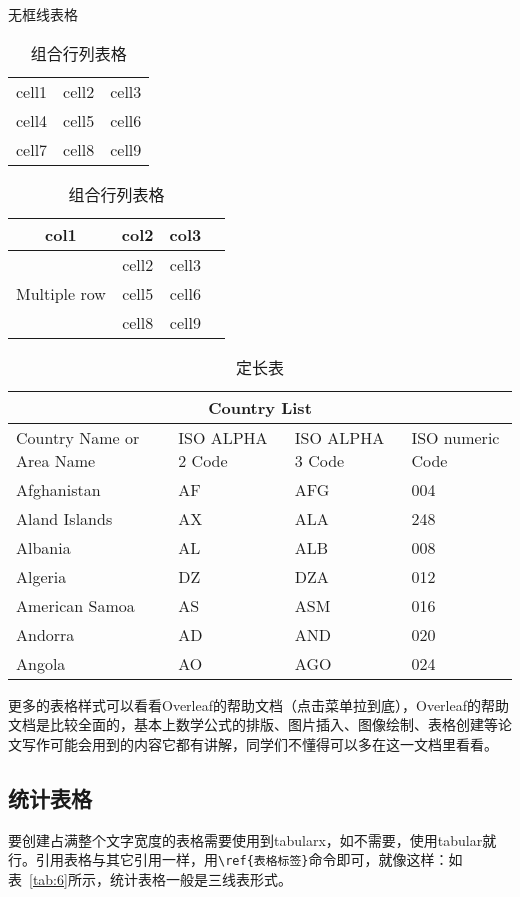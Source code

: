 \begin{table}[ht]
\begin{minipage}[t]{0.5\textwidth}
  \centering
  \caption{无框线表格}
  \label{tab:3}
  \begin{tabular}{ c c c }
 cell1 & cell2 & cell3 \\ 
 cell4 & cell5 & cell6 \\  
 cell7 & cell8 & cell9    
\end{tabular}
\end{minipage}
\begin{minipage}[t]{0.5\textwidth}
\centering
\caption{组合行列表格}
\label{tab:4}
\begin{tabular}{ |c|c|c|c| } 
\hline
col1 & col2 & col3 \\
\hline
\multirow{3}{4em}{Multiple row} & cell2 & cell3 \\ 
& cell5 & cell6 \\ 
& cell8 & cell9 \\ 
\hline
\end{tabular}
\end{minipage}  
\end{table}

\begin{table}[ht]
\centering
\caption{定长表}
\label{tab:5}
\begin{tabular}{ |p{3cm}||p{3cm}|p{3cm}|p{3cm}| }
 \hline
 \multicolumn{4}{|c|}{Country List} \\
 \hline
 Country Name or Area Name& ISO ALPHA 2 Code & ISO ALPHA 3 Code & ISO numeric Code\\
 \hline
 Afghanistan   & AF    &AFG&   004\\
 Aland Islands&   AX  & ALA   &248\\
 Albania &AL & ALB&  008\\
 Algeria    &DZ & DZA&  012\\
 American Samoa&   AS  & ASM&016\\
 Andorra& AD  & AND   &020\\
 Angola& AO  & AGO&024\\
 \hline
\end{tabular}
\end{table}

更多的表格样式可以看看Overleaf的帮助文档（点击菜单拉到底），Overleaf的帮助文档是比较全面的，基本上数学公式的排版、图片插入、图像绘制、表格创建等论文写作可能会用到的内容它都有讲解，同学们不懂得可以多在这一文档里看看。

\subsection{统计表格}
要创建占满整个文字宽度的表格需要使用到tabularx，如不需要，使用tabular就行。引用表格与其它引用一样，用\verb|\ref{表格标签}|命令即可，就像这样：如表~\ref{tab:6}所示，统计表格一般是三线表形式。

